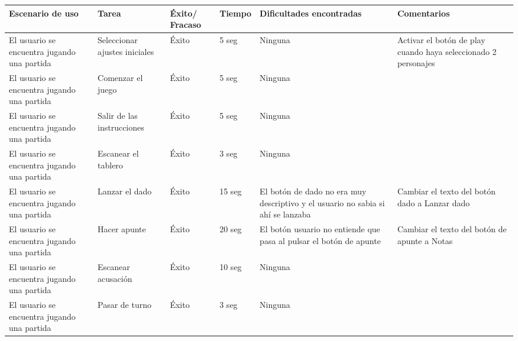 \begin{table}[h]
  \begin{center}
    \begin{tabular}{|p{2.5cm}|p{1.75cm}|p{1.25cm}|p{1.25cm}|p{2.75cm}|p{3.5cm}|}

      \hline
        \rowcolor{Gray} \textbf{Escenario de uso}
        & \textbf{Tarea}
        & \textbf{Éxito/ Fracaso}
        & \textbf{Tiempo}
        & \textbf{Dificultades encontradas}
        & \textbf{Comentarios}\\

      \hline
      El usuario se encuentra jugando una partida
      & Seleccionar ajustes iniciales
      & Éxito
      & 5 seg
      & Ninguna
      & Activar el botón de play cuando haya seleccionado 2 personajes\\

      \hline
      El usuario se encuentra jugando una partida
      & Comenzar el juego
      & Éxito
      & 5 seg
      & Ninguna
      &\\

      \hline
      El usuario se encuentra jugando una partida
      & Salir de las instrucciones
      & Éxito
      & 5 seg
      & Ninguna
      &\\

      \hline
      El usuario se encuentra jugando una partida
      & Escanear el tablero
      & Éxito
      & 3 seg
      & Ninguna
      &\\

      \hline
      El usuario se encuentra jugando una partida
      & Lanzar el dado
      & Éxito
      & 15 seg
      & El botón de dado no era muy descriptivo y el usuario no sabia si ahí se lanzaba
      & Cambiar el texto del botón dado a Lanzar dado\\

      \hline
      El usuario se encuentra jugando una partida
      & Hacer apunte
      & Éxito
      & 20 seg
      & El botón usuario no entiende que pasa al pulsar el botón de apunte
      & Cambiar el texto del botón de apunte a Notas\\

      \hline
      El usuario se encuentra jugando una partida
      & Escanear acusación
      & Éxito
      & 10 seg
      & Ninguna
      &\\

      \hline
      El usuario se encuentra jugando una partida
      & Pasar de turno
      & Éxito
      & 3 seg
      & Ninguna
      &\\


\end{tabular}
\end{center}
\end{table}
